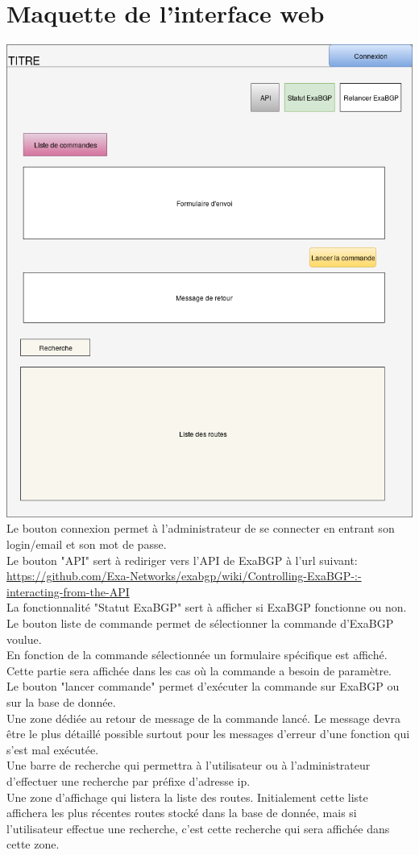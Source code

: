\section{Maquette de l'interface web}

\includegraphics[scale=0.5]{img/maquette.png}
\\
Le bouton connexion permet à l'administrateur de se connecter en entrant son login/email et son mot de passe.\\
Le bouton "API" sert à rediriger vers l'API de ExaBGP à l'url suivant:
\\\url{https://github.com/Exa-Networks/exabgp/wiki/Controlling-ExaBGP-:-interacting-from-the-API}\\
La fonctionnalité "Statut ExaBGP" sert à afficher si ExaBGP fonctionne ou non.\\
Le bouton liste de commande permet de sélectionner la commande d'ExaBGP voulue.\\
En fonction de la commande sélectionnée un formulaire spécifique est affiché. Cette partie sera affichée dans les cas où la commande a besoin de paramètre.\\
Le bouton "lancer commande" permet d’exécuter la commande sur ExaBGP ou sur la base de donnée.\\
Une zone dédiée au retour de message de la commande lancé. Le message devra être le plus détaillé possible surtout pour les messages d'erreur d'une fonction qui s'est mal exécutée.\\
Une barre de recherche qui permettra à l'utilisateur ou à l'administrateur d'effectuer une recherche par préfixe d'adresse ip.\\
Une zone d'affichage qui listera la liste des routes. Initialement cette liste affichera les plus récentes routes stocké dans la base de donnée, mais si l'utilisateur effectue une recherche, c'est cette recherche qui sera affichée dans cette zone.